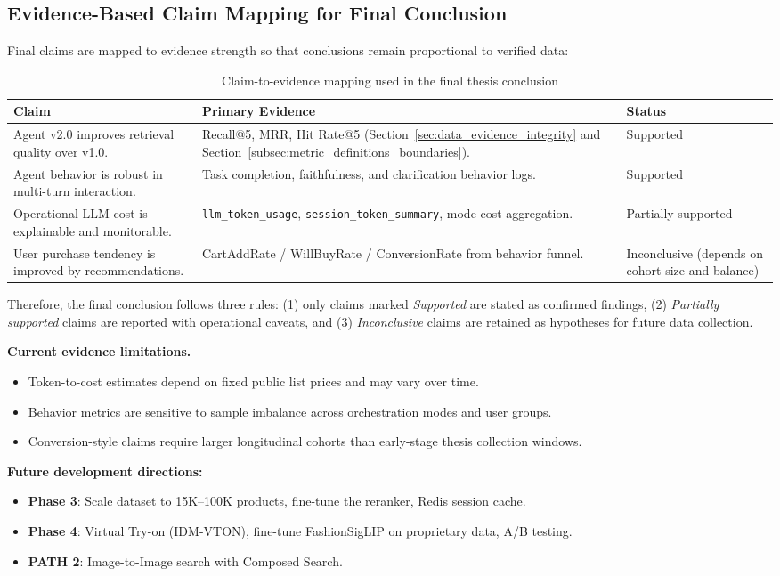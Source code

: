 \subsection{Evidence-Based Claim Mapping for Final Conclusion}
\label{subsec:evidence_claim_mapping}

Final claims are mapped to evidence strength so that conclusions remain proportional to verified data:

\begin{table}[H]
\centering
\begin{tabular}{p{4.0cm}p{5.8cm}p{3.0cm}}
\toprule
\textbf{Claim} & \textbf{Primary Evidence} & \textbf{Status}\\
\midrule
Agent v2.0 improves retrieval quality over v1.0. & Recall@5, MRR, Hit Rate@5 (Section~\ref{sec:data_evidence_integrity} and Section~\ref{subsec:metric_definitions_boundaries}). & Supported\\
Agent behavior is robust in multi-turn interaction. & Task completion, faithfulness, and clarification behavior logs. & Supported\\
Operational LLM cost is explainable and monitorable. & \texttt{llm\_token\_usage}, \texttt{session\_token\_summary}, mode cost aggregation. & Partially supported\\
User purchase tendency is improved by recommendations. & CartAddRate / WillBuyRate / ConversionRate from behavior funnel. & Inconclusive (depends on cohort size and balance)\\
\bottomrule
\end{tabular}
\caption{Claim-to-evidence mapping used in the final thesis conclusion}
\label{tab:claim_evidence_mapping}
\end{table}

Therefore, the final conclusion follows three rules: (1) only claims marked \textit{Supported} are stated as confirmed findings, (2) \textit{Partially supported} claims are reported with operational caveats, and (3) \textit{Inconclusive} claims are retained as hypotheses for future data collection.

\textbf{Current evidence limitations.}
\begin{itemize}
    \item Token-to-cost estimates depend on fixed public list prices and may vary over time.
    \item Behavior metrics are sensitive to sample imbalance across orchestration modes and user groups.
    \item Conversion-style claims require larger longitudinal cohorts than early-stage thesis collection windows.
\end{itemize}

\textbf{Future development directions:}
\begin{itemize}
    \item \textbf{Phase 3}: Scale dataset to 15K--100K products, fine-tune the reranker, Redis session cache.
    \item \textbf{Phase 4}: Virtual Try-on (IDM-VTON), fine-tune FashionSigLIP on proprietary data, A/B testing.
    \item \textbf{PATH 2}: Image-to-Image search with Composed Search.
\end{itemize}
